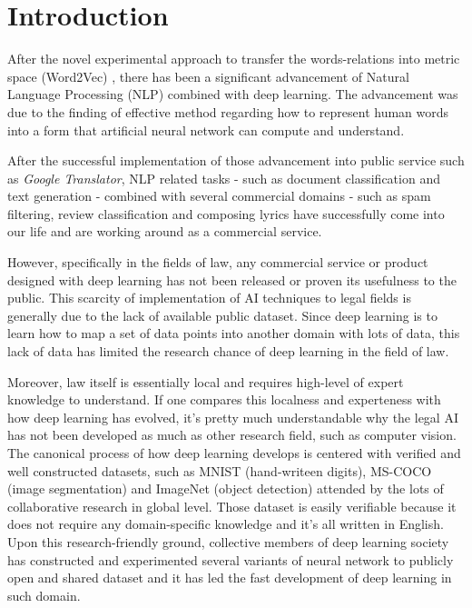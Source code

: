 \documentclass[sigconf]{acmart}
\begin{document}
\maketitle

\section{Introduction}
After the novel experimental approach to transfer the words-relations into metric space (Word2Vec)  \cite{DBLP:journals/corr/MikolovSCCD13}, there has been a significant advancement of Natural Language Processing (NLP) combined with deep learning. The advancement was due to the finding of effective method regarding how to represent human words into a form that artificial neural network can compute and understand. 

After the successful implementation of those advancement into public service such as \textit{Google Translator}, NLP related tasks - such as document classification and text generation - combined with several commercial domains - such as spam filtering, review classification and composing lyrics have successfully come into our life and are working around as a commercial service. 

However, specifically in the fields of law, any commercial service or product designed with deep learning has not been released or proven its usefulness to the public. This scarcity of implementation of AI techniques to legal fields is generally due to the lack of available public dataset. Since deep learning is to learn how to map a set of data points into another domain with lots of data, this lack of data has limited the research chance of deep learning in the field of law.

Moreover, law itself is essentially local and requires high-level of expert knowledge to understand. If one compares this localness and experteness with how deep learning has evolved, it's pretty much understandable why the legal AI has not been developed as much as other research field, such as computer vision. The canonical process of how deep learning develops is centered with  verified and well constructed datasets, such as MNIST (hand-writeen digits), MS-COCO (image segmentation) and ImageNet (object detection) attended by the lots of collaborative research in global level. Those dataset is easily verifiable because it does not require any domain-specific knowledge and it's all written in English. Upon this research-friendly ground, collective members of deep learning society has constructed and experimented several variants of neural network to publicly open and shared dataset and it has led the fast development of deep learning in such domain.
\end{document}
